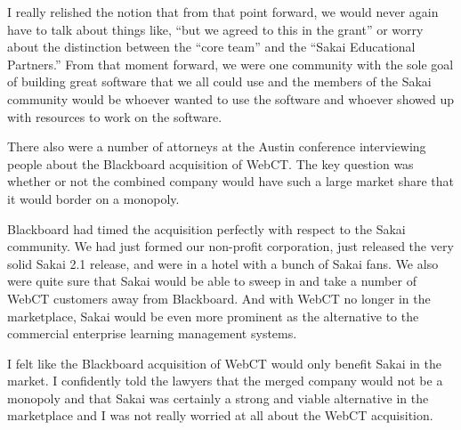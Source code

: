 \documentclass[12pt]{book}
\begin{document}
I really relished the notion that from that point forward,
we would never again have to talk about things like,
``but we agreed to this in the grant'' or worry about
the distinction between the ``core team'' and the
``Sakai Educational Partners.''   From that moment forward,
we were one community with the sole goal of building great
software that we all could use and the members of the
Sakai community would be whoever wanted to use the software
and whoever showed up with resources to work on
the software.

There also were a number of attorneys at the Austin conference
interviewing people about the Blackboard acquisition of WebCT.
The key question was whether or not the combined company
would have such a large market share that it would border on
a monopoly.

Blackboard had timed the acquisition perfectly with respect
to the Sakai community.   We had just formed our non-profit
corporation, just released the very solid Sakai 2.1
release, and were in a hotel with  a bunch of Sakai fans.
We also were quite sure that Sakai would be able to sweep in
and take a number of WebCT customers away from Blackboard.
And with WebCT no longer in the marketplace, Sakai would be
even more prominent as the alternative to the commercial
enterprise learning management systems.

I felt like the Blackboard acquisition of WebCT
would only benefit Sakai in the market.  I confidently told
the lawyers that the merged company would not be a monopoly
and that Sakai was certainly a strong and viable
alternative in the marketplace and I was not really
worried at all about the WebCT acquisition.


\end{document}
